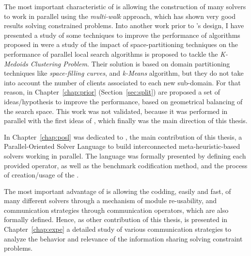 The most important characteristic of \posl{} is allowing the construction of many solvers to work in parallel using the \textit{multi-walk} approach, which has shown very good results solving constrained problems. Into another work prior to \posl's design, I have presented a study of some techniques to improve the performance of algorithms proposed in \cite{Arbelaez2012} were a study of the impact of space-partitioning techniques on the performance of parallel local search algorithms is proposed to tackle the \textit{K-Medoids Clustering Problem}.  Their solution is based on domain partitioning techniques like {\it space-filling curves}, and {\it k-Means} algorithm, but they do not take into account the number of clients associated to each new sub-domain. For that reason, in Chapter~\ref{chap:prior} (Section~\ref{sec:split}) are proposed a set of ideas/hypothesis to improve the performance, based on geometrical balancing of the search space. This work was not validated, because it was performed in parallel with the first ideas of \posl, which finally was the main direction of this thesis.

In Chapter~\ref{chap:posl} was dedicated to \posl, the main contribution of this thesis, a Parallel-Oriented Solver Language to build
interconnected meta-heuristic-based solvers working in parallel. The language was formally presented by defining each provided operator, as well as the benchmark codification method, and the process of creation/usage of the \bothmodules. 

The most important advantage of \posl{} is allowing the codding, easily and fast, of many different solvers through a mechanism of module re-usability, and communication strategies through communication operators, which are also formally defined. Hence, as other contribution of this thesis, is presented in Chapter~\ref{chap:expe} a detailed study of various communication strategies to analyze the behavior and relevance of the information sharing solving constraint problems.


